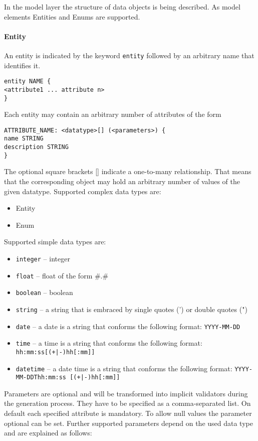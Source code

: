 
In the model layer the structure of data objects is being described. As model elements Entities and Enums are supported.
\paragraph{Entity}
An entity is indicated by the keyword {\lstinline!entity!} followed by an arbitrary name that identifies it.
\begin{lstlisting}
entity NAME {
<attribute1 ... attribute n>
}
\end{lstlisting}
Each entity may contain an arbitrary number of attributes of the form
\begin{lstlisting}
ATTRIBUTE_NAME: <datatype>[] (<parameters>) {
name STRING
description STRING
}
\end{lstlisting}
The optional square brackets [] indicate a one-to-many relationship. That means that the corresponding object may hold an arbitrary number of values of the given datatype.
Supported complex data types are:
\begin{itemize}
\item{Entity}
\item{Enum}
\end{itemize}
Supported simple data types are:

\begin{itemize}
\item{\lstinline!integer! -- integer}
\item{\lstinline!float! -- float of the form \#.\#}
\item{\lstinline!boolean! -- boolean}
\item{\lstinline!string! -- a string that is embraced by single quotes (') or double quotes (")}
\item{\lstinline!date! -- a date is a string that conforms the following format: \lstinline!YYYY-MM-DD!}
\item{\lstinline!time! -- a time is a string that conforms the following format: \lstinline!hh:mm:ss[(+|-)hh[:mm]]!}
\item{\lstinline!datetime! -- a date time is a string that conforms the following format: \lstinline!YYYY-MM-DDThh:mm:ss [(+|-)hh[:mm]]!}
\end{itemize}

Parameters are optional and will be transformed into implicit validators during the generation process. They have to be specified as a comma-separated list. On default each specified attribute is mandatory. To allow null values the parameter optional can be set. Further supported parameters depend on the used data type and are explained as follows:

